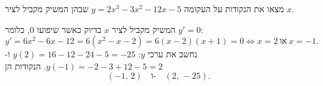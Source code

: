 
\begin{question}
מצאו את הנקודות על העקומה $y=2x^3-3x^2-12x-5$ שבהן המשיק מקביל לציר $x$.
\end{question}

\begin{solution}
המשיק מקביל לציר $x$ בדיוק כאשר שיפועו $0$, כלומר $y'=0$:
\[ y'=6x^2-6x-12=6(x^2-x-2)=6(x-2)(x+1)=0\iff x=2\ \text{או}\ x=-1. \]
נחשב את ערכי $y$: $y(2)=16-12-24-5=-25$ ו-$y(-1)=-2-3+12-5=2$. הנקודות הן
\[ \boxed{(-1,\,2)\quad\text{ו-}\quad(2,\,-25)}. \]
\end{solution}
